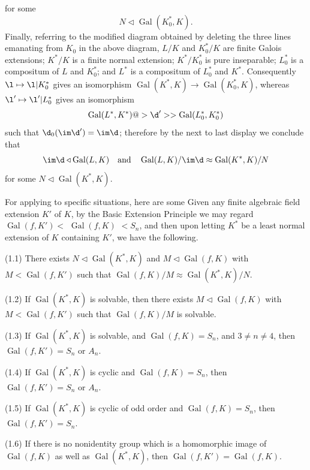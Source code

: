 for some
$$
N\triangleleft\operatorname{Gal}(K^*_0,K).
$$
Finally, referring to the modified diagram obtained by 
deleting the three 
lines emanating from $K_0$ in the above diagram, 
$L/K$ and $K^*_0/K$ are finite Galois extensions; $K^*/K$ 
is a finite normal
extension; $K^*/K^*_0$ is pure inseparable; $L^*_0$ is a 
compositum of $L$ and
$K^*_0$; and $L^*$ is a compositum of $L^*_0$ and $K^*$. 
Consequently
$\l\mapsto\l|K^*_0$ gives an isomorphism 
$\operatorname{Gal}(K^*,K)\to\operatorname{Gal}(K^*_0,K)$, 
whereas $\l'\mapsto\l'|L^*_0$ 
gives an isomorphism
$$
\operatorname{Gal}(L^*,K^*)@>\d'>>%
\operatorname{Gal}(L^*_0,K^*_0)
$$
such that $\d_0(\im\d')=\im\d$; therefore by the next to 
last display we
conclude that
$$
\im\d\triangleleft\operatorname{Gal}(L,K)\quad\text{and}%
\quad
\operatorname{Gal}(L,K)/\im\d\approx%
\operatorname{Gal}(K^*,K)/N
$$
for some 
$N\triangleleft\operatorname{Gal}(K^*,K)$.

For applying to specific situations, here are some
Given any finite algebraic field extension $K'$ of $K$, by 
the Basic
Extension Principle we may regard 
$\operatorname{Gal}(f,K')<$ $\operatorname{Gal}(f,K)$ 
$<S_n$,
and then upon letting $K^*$ be a least normal
extension of $K$ containing $K'$, we have the following.

{\rm(1.1)} There exists 
$N\triangleleft\operatorname{Gal}(K^*,K)$ and
$M\triangleleft\operatorname{Gal}(f,K)$ with 
$M<\operatorname{Gal}(f,K')$ such that
$\operatorname{Gal}(f,K)/M\approx%
\operatorname{Gal}(K^*,K)/N$.

{\rm(1.2)} If $\operatorname{Gal}(K^*,K)$ is solvable, 
then there exists 
$M\triangleleft\operatorname{Gal}(f,K)$ with 
$M<\operatorname{Gal}(f,K')$ such that
$\operatorname{Gal}(f,K)/M$ is solvable.

{\rm(1.3)} If $\operatorname{Gal}(K^*,K)$ is solvable, and 
$\operatorname{Gal}(f,K)=S_n$, and 
$3\ne n\ne 4$, then $\operatorname{Gal}(f,K')=S_n\text{ or 
}A_n$.

{\rm(1.4)} If $\operatorname{Gal}(K^*,K)$ is cyclic and 
$\operatorname{Gal}(f,K)=S_n$, 
then %
$\operatorname{Gal}(f,K')=S_n\text{ or }A_n$.

{\rm(1.5)} If $\operatorname{Gal}(K^*,K)$ is cyclic of odd 
order 
and $\operatorname{Gal}(f,K)=S_n$, 
then%
$\operatorname{Gal}(f,K')=S_n$.

{\rm(1.6)} If there is no nonidentity group which is a 
homomorphic 
image of$\operatorname{Gal}
(f,K)$ as well as  $\operatorname{Gal}(K^*,K)$, then 
$\operatorname{Gal}(f,K')=\operatorname{Gal}(f,K)$.

